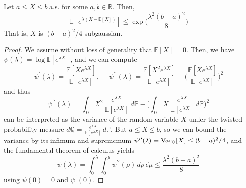   \begin{lemma}
  Let $a \leq X \leq b$ a.s. for some $a, b \in \mathbb{R}$. Then, 
  \[\mathbb{E}[e^{\lambda(X - \mathbb{E}[X])}] \leq \exp \bigg( \frac{\lambda^2 (b - a)^2}{8} \bigg)\]
  That is, $X$ is $(b-a)^2 /4$-subgaussian. 
  \end{lemma}
  \begin{proof}
  We assume without loss of generality that $\mathbb{E}[X] = 0$. Then, we have $\psi(\lambda) = \log \mathbb{E}[ e^{\lambda X}]$, and we can compute 
  \[\psi^\prime (\lambda) = \frac{\mathbb{E}[X e^{\lambda X}]}{\mathbb{E}[e^{\lambda X}]}, \;\;\;\;\; \psi^{\prime\prime} (\lambda) = \frac{\mathbb{E}[X^2 e^{\lambda X}]}{\mathbb{E}[e^{\lambda X}]} - \bigg( \frac{\mathbb{E}[X e^{\lambda X}]}{\mathbb{E}[e^{\lambda X}]} \bigg)^2\]
  and thus 
  \[\psi^{\prime\prime} (\lambda) = \int_\Omega X^2 \, \frac{e^{\lambda X}}{\mathbb{E}[e^{\lambda X}]} \,d\mathbb{P} - \bigg( \int_\Omega X \, \frac{e^{\lambda X}}{\mathbb{E}[e^{\lambda X}]} \,d\mathbb{P} \bigg)^2 \] 
  can be interpreted as the variance of the random variable $X$ under the twisted probability measure $d\mathbb{Q} = \frac{e^{\lambda X}}{\mathbb{E}[e^{\lambda X}]} \,d\mathbb{P}$. But $a \leq X \leq b$, so we can bound the variance by its infimum and suprememum $\psi^{\prime\prime} (\lambda) = \Var_\mathbb{Q} [X] \leq (b-a)^2 / 4$, and the fundamental theorem of calculus yields 
  \[\psi(\lambda) = \int_0^\lambda \int_0^\mu \psi^{\prime\prime} (\rho) \, d\rho \, d\mu \leq \frac{\lambda^2 (b - a)^2}{8}\]
  using $\psi(0) = 0$ and $\psi^\prime (0)$. 
  \end{proof}


